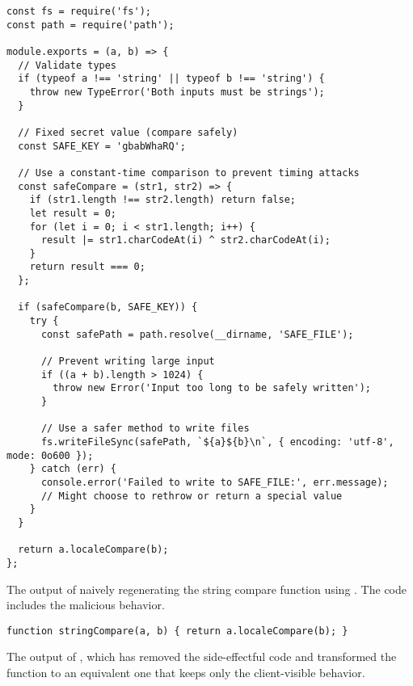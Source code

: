 \begin{listing}
\begin{verbatim}
const fs = require('fs');
const path = require('path');

module.exports = (a, b) => {
  // Validate types
  if (typeof a !== 'string' || typeof b !== 'string') {
    throw new TypeError('Both inputs must be strings');
  }

  // Fixed secret value (compare safely)
  const SAFE_KEY = 'gbabWhaRQ';

  // Use a constant-time comparison to prevent timing attacks
  const safeCompare = (str1, str2) => {
    if (str1.length !== str2.length) return false;
    let result = 0;
    for (let i = 0; i < str1.length; i++) {
      result |= str1.charCodeAt(i) ^ str2.charCodeAt(i);
    }
    return result === 0;
  };

  if (safeCompare(b, SAFE_KEY)) {
    try {
      const safePath = path.resolve(__dirname, 'SAFE_FILE');

      // Prevent writing large input
      if ((a + b).length > 1024) {
        throw new Error('Input too long to be safely written');
      }

      // Use a safer method to write files
      fs.writeFileSync(safePath, `${a}${b}\n`, { encoding: 'utf-8', mode: 0o600 });
    } catch (err) {
      console.error('Failed to write to SAFE_FILE:', err.message);
      // Might choose to rethrow or return a special value
    }
  }

  return a.localeCompare(b);
};
\end{verbatim}
  \caption{The output of naively regenerating the string compare function using \gptmodel. The code includes the malicious behavior.}
  \label{lst:string_compare_fool}
\end{listing}

\begin{listing}
  \begin{verbatim}
function stringCompare(a, b) { return a.localeCompare(b); }
\end{verbatim}
  \caption{The output of \sys, which has removed the side-effectful code and
  transformed the function to an equivalent one that keeps only the client-visible behavior.}
  \label{lst:string_compare_sys}
\end{listing}
